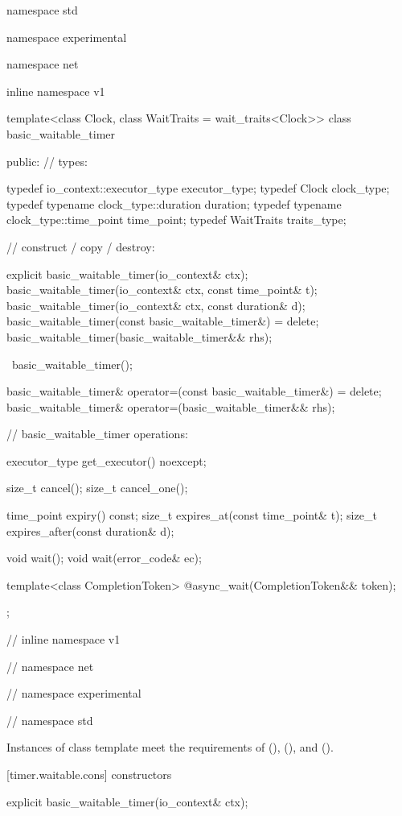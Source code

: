 %
\begin{codeblock}
namespace std {
namespace experimental {
namespace net {
inline namespace v1 {

  template<class Clock, class WaitTraits = wait_traits<Clock>>
  class basic_waitable_timer
  {
  public:
    // types:

    typedef io_context::executor_type executor_type;
    typedef Clock clock_type;
    typedef typename clock_type::duration duration;
    typedef typename clock_type::time_point time_point;
    typedef WaitTraits traits_type;

    // construct / copy / destroy:

    explicit basic_waitable_timer(io_context& ctx);
    basic_waitable_timer(io_context& ctx, const time_point& t);
    basic_waitable_timer(io_context& ctx, const duration& d);
    basic_waitable_timer(const basic_waitable_timer&) = delete;
    basic_waitable_timer(basic_waitable_timer&& rhs);

    ~basic_waitable_timer();

    basic_waitable_timer& operator=(const basic_waitable_timer&) = delete;
    basic_waitable_timer& operator=(basic_waitable_timer&& rhs);

    // basic_waitable_timer operations:

    executor_type get_executor() noexcept;

    size_t cancel();
    size_t cancel_one();

    time_point expiry() const;
    size_t expires_at(const time_point& t);
    size_t expires_after(const duration& d);

    void wait();
    void wait(error_code& ec);

    template<class CompletionToken>
      @\DEDUCED@ async_wait(CompletionToken&& token);
  };

} // inline namespace v1
} // namespace net
} // namespace experimental
} // namespace std
\end{codeblock}

\pnum
Instances of class template  meet the requirements of  (),  (), and  ().


[timer.waitable.cons]{ constructors}

%
\begin{itemdecl}
explicit basic_waitable_timer(io_context& ctx);
\end{itemdecl}

